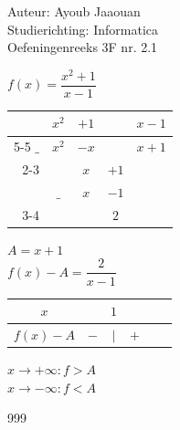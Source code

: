 \documentclass[a4paper]{article}
\begin{document}
\noindent \large Auteur: Ayoub Jaaouan \\
\noindent \large Studierichting: Informatica\\
\noindent \large Oefeningenreeks 3F nr. 2.1\\

\medskip

\normalsize

$f(x) = \dfrac{x^2+1}{x-1}$\\

\medskip

\begin{tabular}{rccc|l}
     & $x^2$ & $+1$                && $x-1$  \\ \cline{5-5} 
$\_$ & $x^2$ & $-x$ &              & $x+1$ \\ \cline{2-3}
     &          & $x$  & $+1$         &        \\
     & $\_$     & $x$  & $-1$         &        \\ \cline{3-4}
     &          &       & $2$          &        \\ 
\end{tabular}

\medskip

$A = x+1$\\

$ f(x) - A = \dfrac{2}{x-1}$ \\

\medskip

\begin{tabular}{c|ccccc}
$x$				 &     & $1$ &     & \\ \hline
$f(x) - A$ & $-$ & $|$ & $+$ & \\
\end{tabular}

\bigskip

$x \rightarrow +\infty : f>A$\\

$x \rightarrow -\infty : f<A$\\




\begin{thebibliography}{999}
\end{thebibliography}
\end{document}

